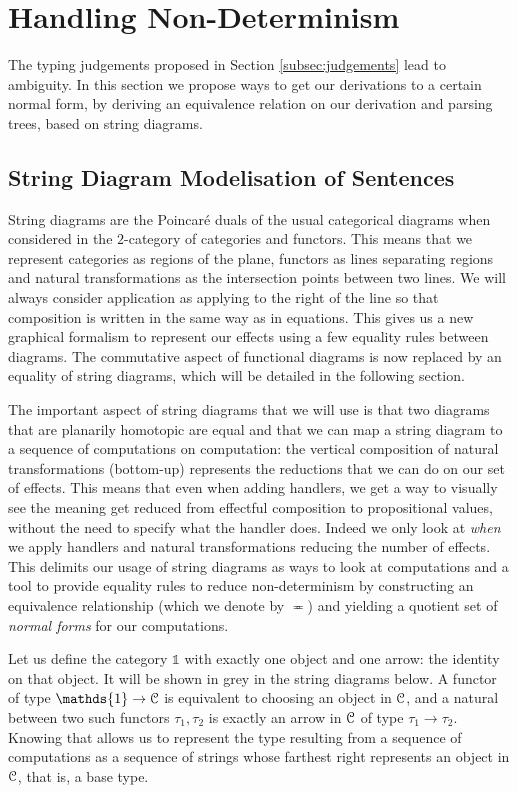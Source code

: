 \section{Handling Non-Determinism}
\label{sec:nondet}
The typing judgements proposed in Section \ref{subsec:judgements} lead to ambiguity.
In this section we propose ways to get our derivations to a certain normal form, by deriving an equivalence relation on our derivation and parsing trees, based on string diagrams.

\subsection{String Diagram Modelisation of Sentences}
\label{subsec:sd}
String diagrams are the Poincaré duals of the usual categorical diagrams when
considered in the $2$-category of categories and functors.
This means that we represent categories as regions of the plane, functors as
lines separating regions and natural transformations as the intersection points
between two lines.
We will always consider application as applying to the right of the line so
that composition is written in the same way as in equations.
This gives us a new graphical formalism to represent our effects using a few
equality rules between diagrams.
The commutative aspect of functional diagrams is now replaced by an equality of
string diagrams, which will be detailed in the following section.

The important aspect of string diagrams that we will use is that two diagrams that are planarily homotopic are equal \cite{joyalGeometryTensorCalculus1991} and that we can map a string diagram to a sequence of computations on computation: the vertical composition of natural transformations (bottom-up) represents the reductions that we can do on our set of effects.
This means that even when adding handlers, we get a way to visually see the meaning get reduced from effectful composition to propositional values, without the need to specify what the handler does.
Indeed we only look at \emph{when} we apply handlers and natural transformations reducing the number of effects.
This delimits our usage of string diagrams as ways to look at computations and a tool to provide equality rules to reduce non-determinism by constructing an equivalence relationship (which we denote by $\eqcirc$) and yielding a quotient set of \emph{normal forms} for our computations.

Let us define the category $\mathds{1}$ with exactly one object and one arrow: the identity on that object. It will be shown in grey in the string diagrams below.
A functor of type $\mathds{1} \to \mC$ is equivalent to choosing an object in $\mathcal{C}$, and a natural between two such functors $\tau_{1}, \tau_{2}$ is exactly an arrow in $\mathcal{C}$ of type $\tau_{1} \to \tau_{2}$.
Knowing that allows us to represent the type resulting from a sequence of computations as a sequence of strings whose farthest right represents an object in $\mathcal{C}$, that is, a base type.
\begin{center}
	
\end{center}

